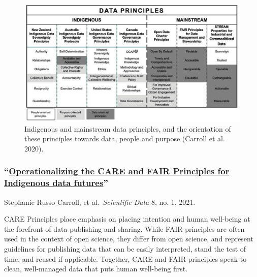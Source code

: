 \documentclass[
]{book}
\begin{document}
\begin{figure}
\includegraphics[width=18.39in]{images/care} \caption{Indigenous and mainstream data principles, and the orientation of these principles towards data, people and purpose (Carroll et al. 2020).}\label{fig:unnamed-chunk-6}
\end{figure}

\hypertarget{operationalizing-the-care-and-fair-principles-for-indigenous-data-futures}{%
\subsubsection*{\texorpdfstring{``\href{https://doi.org/10.1038/s41597-021-00892-0}{Operationalizing the CARE and FAIR Principles for Indigenous data futures}''}{``Operationalizing the CARE and FAIR Principles for Indigenous data futures''}}\label{operationalizing-the-care-and-fair-principles-for-indigenous-data-futures}}

Stephanie Russo Carroll, et al.~\emph{Scientific Data} 8, no. 1. 2021.

CARE Principles place emphasis on placing intention and human well-being at the forefront of data publishing and sharing. While FAIR principles are often used in the context of open science, they differ from open science, and represent guidelines for publishing data that can be easily interpreted, stand the test of time, and reused if applicable. Together, CARE and FAIR principles speak to clean, well-managed data that puts human well-being first.
\end{document}
